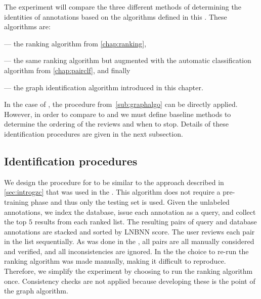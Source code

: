     The experiment will compare the three different methods of determining the identities of annotations based on
      the algorithms defined in this \thesis{}.
    These algorithms are:
    \begin{enumin}

    \item {} --- the ranking algorithm from \cref{chap:ranking}, 

    \item {} --- the same
        ranking algorithm but augmented with the automatic classification algorithm from \cref{chap:pairclf}, and
        finally

    \item {} --- the graph identification algorithm introduced in this chapter.

    \end{enumin}
    In the case of , the procedure from~\cref{sub:graphalgo} can be directly applied.
    However, in order to compare  to  and  we must define baseline
      methods to determine the ordering of the reviews and when to stop.
    Details of these identification procedures are given in the next subsection.

    \FloatBarrier{}
    \subsection{Identification procedures}

    We design the procedure for  to be similar to the approach described in \cref{sec:introgzc}
      that was used in the \GZC{}.
    This algorithm does not require a pre-training phase and thus only the testing set is used.
    Given the unlabeled annotations, we index the database, issue each annotation as a query, and collect the top
      $5$ results from each ranked list.
    The resulting pairs of query and database annotations are stacked and sorted by LNBNN score.
    The user reviews each pair in the list sequentially.
    As was done in the \GZC{}, all pairs are all manually considered and verified, and all inconsistencies are
      ignored.
    In the \GZC{} the choice to re-run the ranking algorithm was made manually, making it difficult to reproduce.
    Therefore, we simplify the experiment by choosing to run the ranking algorithm once.
    Consistency checks are not applied because developing these is the point of the graph algorithm.

